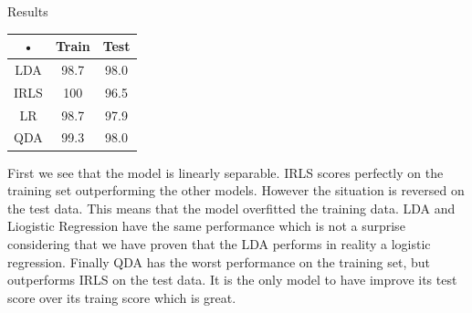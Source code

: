 \documentclass[a4paper]{article}
\begin{document}
\begin{minipage}[c]{0,35\textwidth}
Results\\
\begin{tabular}{|c|c|c|}
\hline 
• & Train & Test \\ 
\hline 
LDA & 98.7 & 98.0 \\ 
\hline 
IRLS & 100 & 96.5 \\ 
\hline 
LR & 98.7 & 97.9 \\ 
\hline 
QDA & 99.3 & 98.0 \\ 
\hline 
\end{tabular} 
\end{minipage}
\begin{minipage}{0,6\textwidth}
First we see that the model is linearly separable. IRLS scores perfectly on the training set outperforming the other models. However the situation is reversed on the test data. This means that the model overfitted the training data. LDA and Liogistic Regression have the same performance which is not a surprise considering that we have proven that the LDA performs in reality a logistic regression. Finally QDA has the worst performance on the training set, but outperforms IRLS on the test data. It is the only model to have improve its test score over its traing score which is great.
\end{minipage}
\newpage
\end{document}
